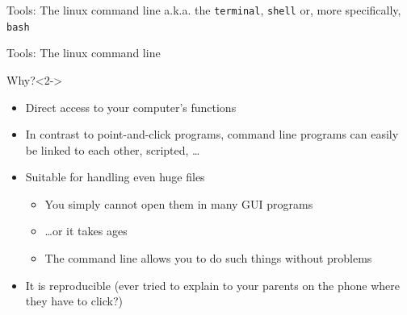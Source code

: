 \documentclass{beamer}
\begin{document}
\begin{frame}{Tools: The linux command line}
	a.k.a. the {\tt terminal}, {\tt shell} or, more specifically, {\tt bash}\\
\end{frame}

\begin{frame}{Tools: The linux command line}
	\begin{block}{Why?}<2->
		\begin{itemize}
			\item<3-> Direct access to your computer's functions
			\item<4-> In contrast to point-and-click programs, command line programs can easily be linked to each other, scripted, \ldots
			\item<5-> Suitable for handling even huge files
			\begin{itemize}
				\item<6-> You simply cannot open them in many GUI programs
				\item<6-> \ldots or it takes ages
				\item<6-> The command line allows you to do such things without problems
			\end{itemize}
			\item<7->It is reproducible (ever tried to explain to your parents on the phone where they have to click?)
		\end{itemize}
	\end{block}
\end{frame}
\end{document}
